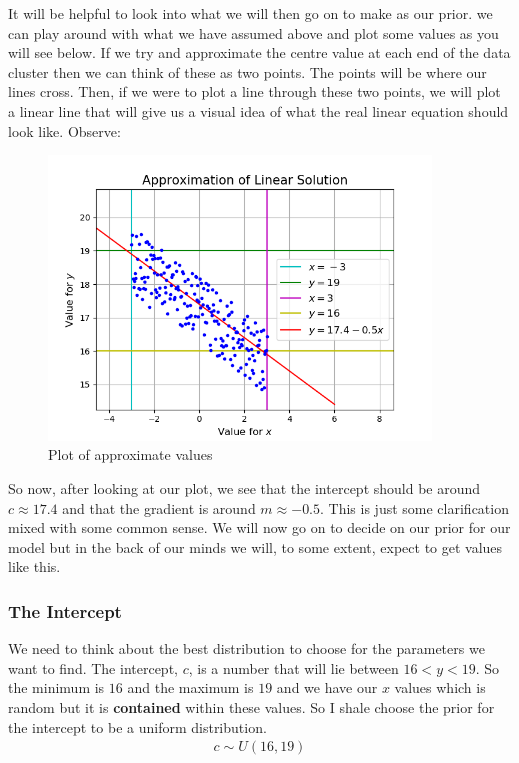 \documentclass[11pt]{article}   %
\begin{document}
It will be helpful to look into what we will then go on to make as our prior. we can play around with what we have assumed above and plot some values as you will see below. If we try and approximate the centre value at each end of the data cluster then we can think of these as two points. The points will be where our lines cross. Then, if we were to plot a line through these two points, we will plot a linear line that will give us a visual idea of what the real linear equation should look like. Observe:
\begin{figure}[H]
\centering
\includegraphics[width = 4in]{Approx.png}
\caption{Plot of approximate values}
\label{figLinearData}
\end{figure}

So now, after looking at our plot, we see that the intercept should be around $c\approx 17.4$ and that the gradient is around $m\approx -0.5$. This is just some clarification mixed with some common sense. We will now go on to decide on our prior for our model but in the back of our minds we will, to some extent, expect to get values like this.

\subsubsection{The Intercept}\label{The Intercept}

We need to think about the best distribution to choose for the parameters we want to find. The intercept, $c$, is a number that will lie between $16<y<19$. So the minimum is $16$ and the maximum is $19$ and we have our $x$ values which is random but it is \textbf{contained} within these values. So I shale choose the prior for the intercept to be a uniform distribution.
\begin{align*}
c \sim U(16, 19)
\end{align*}
\end{document}
